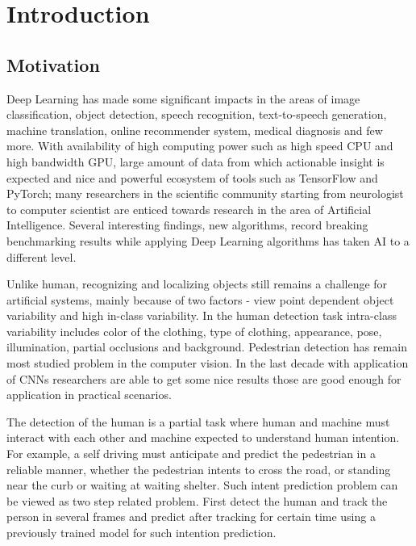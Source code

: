 \pagestyle{fancy}
\fancyhf{}
\fancyhead[EL]{\leftmark} %
\fancyhead[OL]{\leftmark}
\fancyhead[ER,OR]{\thepage}

\setcounter{page}{1}

\chapter{Introduction}
\section{Motivation}
Deep Learning has made some significant impacts in the areas of image classification, 
object detection, speech recognition, text-to-speech generation, machine translation,
online recommender system, medical diagnosis and few more. With availability of high 
computing power such as high speed CPU and high bandwidth GPU, large amount of 
data from which actionable insight is expected and nice and powerful ecosystem of  
tools such as TensorFlow and PyTorch; many researchers in the scientific community 
starting from neurologist to computer scientist are enticed towards research in the area 
of Artificial Intelligence. Several interesting findings, new algorithms, record 
breaking benchmarking results while applying Deep Learning algorithms has taken 
AI to a different level.

\vspace{1em}
\noindent Unlike human, recognizing and localizing objects still remains a challenge for artificial 
systems, mainly because of two factors - view point dependent object variability and
high in-class variability. In the human detection task intra-class variability includes
color of the clothing, type of clothing, appearance, pose, illumination, partial occlusions
and background. Pedestrian detection has remain most studied problem in the computer vision.
In the last decade with application of CNNs researchers are able to get some nice results 
those are good enough for application in practical scenarios.

\vspace{1em}
\noindent The detection of the human is a partial task where human and machine must interact 
with each other and machine expected to understand human intention. For example, 
a self driving must anticipate and predict the pedestrian in a reliable manner, whether 
the pedestrian intents to cross the road, or standing near the curb or waiting at waiting shelter.
Such intent prediction problem can be viewed as two step related problem. First detect the 
human and track the person in several frames and predict after tracking for certain time using a 
previously trained model for such intention prediction.

